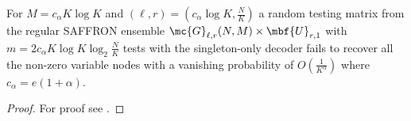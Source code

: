 \documentclass[conference,twocolumn]{IEEEtran}
\def\ceps{c_{\epsilon}}
\def\proofgap{-3ex}
\begin{document}
\begin{theorem}
For $M=c_\alpha K \log K$ and $(\ell,r)=(c_\alpha \log K,\frac{N}{K})$ a random testing matrix from the regular SAFFRON ensemble $\mc{G}_{\ell,r}(N,M)\times \mbf{U}_{r,1}$ with $m=2c_\alpha K\log K \log_2 \frac{N}{K}$ tests with the singleton-only decoder fails to recover all the non-zero variable nodes with a vanishing probability of $O(\frac{1}{K^{\alpha}})$ where $c_\alpha=e(1+\alpha)$.
%
\end{theorem}
\vspace{\proofgap}
\begin{proof}
For proof see .%
%
\end{proof}
\end{document}
